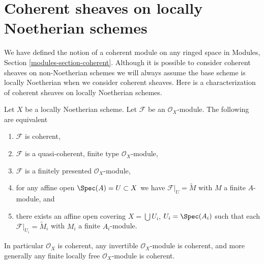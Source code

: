 \section{Coherent sheaves on locally Noetherian schemes}
\label{section-coherent-sheaves}

\noindent
We have defined the notion of a coherent module on any ringed space in
Modules, Section \ref{modules-section-coherent}.
Although it is possible to consider coherent sheaves on non-Noetherian
schemes we will always assume the base scheme is locally Noetherian when
we consider coherent sheaves. Here is a characterization of coherent
sheaves on locally Noetherian schemes.

\begin{lemma}
\label{lemma-coherent-Noetherian}
Let $X$ be a locally Noetherian scheme.
Let $\mathcal{F}$ be an $\mathcal{O}_X$-module.
The following are equivalent
\begin{enumerate}
\item $\mathcal{F}$ is coherent,
\item $\mathcal{F}$ is a quasi-coherent, finite type $\mathcal{O}_X$-module,
\item $\mathcal{F}$ is a finitely presented $\mathcal{O}_X$-module,
\item for any affine open $\Spec(A) = U \subset X$ we have
$\mathcal{F}|_U = \widetilde M$ with $M$ a finite $A$-module, and
\item there exists an affine open covering $X = \bigcup U_i$,
$U_i = \Spec(A_i)$ such that each
$\mathcal{F}|_{U_i} = \widetilde M_i$ with $M_i$ a finite $A_i$-module.
\end{enumerate}
In particular $\mathcal{O}_X$ is coherent, any invertible
$\mathcal{O}_X$-module is coherent, and more generally any
finite locally free $\mathcal{O}_X$-module is coherent.
\end{lemma}

